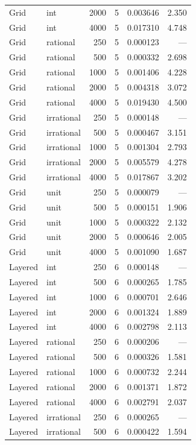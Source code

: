 \begin{longtable}{l l r r r r}
Grid & int & 2000 & 5 & 0.003646 & 2.350 \\
Grid & int & 4000 & 5 & 0.017310 & 4.748 \\
\addlinespace
Grid & rational & 250 & 5 & 0.000123 & --- \\
Grid & rational & 500 & 5 & 0.000332 & 2.698 \\
Grid & rational & 1000 & 5 & 0.001406 & 4.228 \\
Grid & rational & 2000 & 5 & 0.004318 & 3.072 \\
Grid & rational & 4000 & 5 & 0.019430 & 4.500 \\
\addlinespace
Grid & irrational & 250 & 5 & 0.000148 & --- \\
Grid & irrational & 500 & 5 & 0.000467 & 3.151 \\
Grid & irrational & 1000 & 5 & 0.001304 & 2.793 \\
Grid & irrational & 2000 & 5 & 0.005579 & 4.278 \\
Grid & irrational & 4000 & 5 & 0.017867 & 3.202 \\
\addlinespace
Grid & unit & 250 & 5 & 0.000079 & --- \\
Grid & unit & 500 & 5 & 0.000151 & 1.906 \\
Grid & unit & 1000 & 5 & 0.000322 & 2.132 \\
Grid & unit & 2000 & 5 & 0.000646 & 2.005 \\
Grid & unit & 4000 & 5 & 0.001090 & 1.687 \\
\addlinespace
Layered & int & 250 & 6 & 0.000148 & --- \\
Layered & int & 500 & 6 & 0.000265 & 1.785 \\
Layered & int & 1000 & 6 & 0.000701 & 2.646 \\
Layered & int & 2000 & 6 & 0.001324 & 1.889 \\
Layered & int & 4000 & 6 & 0.002798 & 2.113 \\
\addlinespace
Layered & rational & 250 & 6 & 0.000206 & --- \\
Layered & rational & 500 & 6 & 0.000326 & 1.581 \\
Layered & rational & 1000 & 6 & 0.000732 & 2.244 \\
Layered & rational & 2000 & 6 & 0.001371 & 1.872 \\
Layered & rational & 4000 & 6 & 0.002791 & 2.037 \\
\addlinespace
Layered & irrational & 250 & 6 & 0.000265 & --- \\
Layered & irrational & 500 & 6 & 0.000422 & 1.594 \\

\end{longtable}
